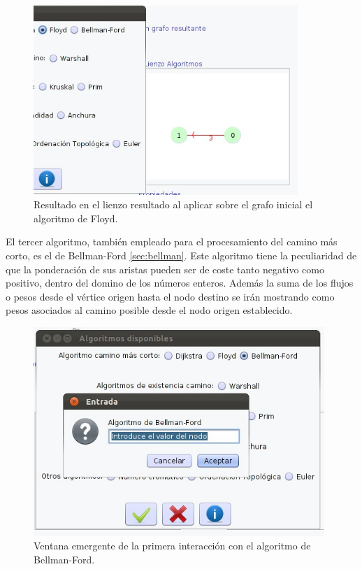 \begin{figure}[H]
\begin{center}
\includegraphics[width=10cm]{./imagenes_documentacion/imagen_resultado_floyd.jpeg}
\caption{Resultado en el lienzo resultado al aplicar sobre el grafo inicial el algoritmo de Floyd.}
\end{center}
\end{figure}

El tercer algoritmo, también empleado para el procesamiento del camino más corto, es el de Bellman-Ford \ref{sec:bellman}. Este algoritmo tiene la peculiaridad de que la ponderación de sus aristas pueden ser de coste tanto negativo como positivo, dentro del domino de los números enteros. Además la suma de los flujos o pesos desde el vértice origen hasta el nodo destino se irán mostrando como pesos asociados al camino posible desde el nodo origen establecido.
\newpage
\begin{figure}[H]
\begin{center}
\includegraphics[width=11cm]{./imagenes_documentacion/imagen_bellman_ford_ventana_datos.jpeg}
\caption{Ventana emergente de la primera interacción con el algoritmo de Bellman-Ford.}
\end{center}
\end{figure}


